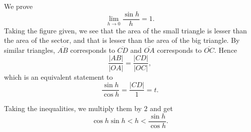We prove
\[\lim_{h\to0} \frac{\sin h}{h} = 1.\]
Taking the figure given, we see that the area of the small triangle is lesser than the area of the sector, and that is lesser than the area of the big triangle. By similar triangles, $\overline{AB}$ corresponds to $\overline{CD}$ and $\overline{OA}$ corresponds to $\overline{OC}$. Hence
\[\frac{|AB|}{|OA|} = \frac{|CD|}{|OC|},\]
which is an equivalent statement to
\[\frac{\sin h}{\cos h} = \frac{|CD|}{1} = t.\]

Taking the inequalities, we multiply them by $2$ and get
\[\cos h \sin h < h < \frac{\sin h}{\cos h}.\]

